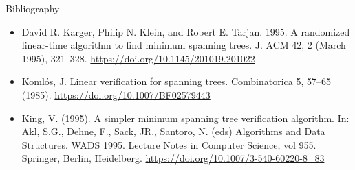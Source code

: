 \documentclass[aspectratio=169]{beamer}
\begin{document}
\begin{frame}[allowframebreaks]{Bibliography}
    
    \begin{itemize}
        \item David R. Karger, Philip N. Klein, and Robert E. Tarjan. 1995. A randomized linear-time algorithm to find minimum spanning trees. J. ACM 42, 2 (March 1995), 321–328. \url{https://doi.org/10.1145/201019.201022}
        \item Komlós, J. Linear verification for spanning trees. Combinatorica 5, 57–65 (1985). \url{https://doi.org/10.1007/BF02579443}
        \item King, V. (1995). A simpler minimum spanning tree verification algorithm. In: Akl, S.G., Dehne, F., Sack, JR., Santoro, N. (eds) Algorithms and Data Structures. WADS 1995. Lecture Notes in Computer Science, vol 955. Springer, Berlin, Heidelberg. \url{https://doi.org/10.1007/3-540-60220-8_83}
    \end{itemize}
\end{frame}
\end{document}
